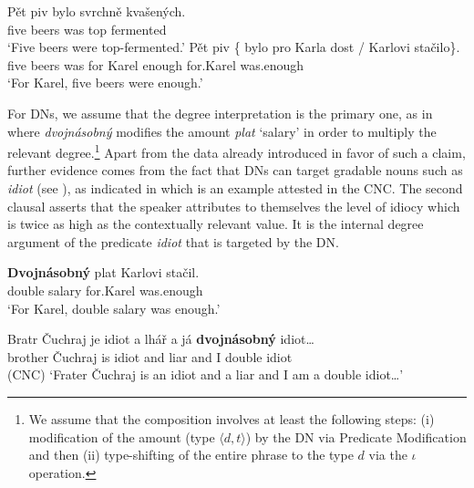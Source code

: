 \documentclass[output=paper,modfonts,hidelinks,newtxmath
\ChapterDOI{10.5281/zenodo.2545513}
]{langscibook}
\begin{document}
\ea \ea \gll Pět piv bylo svrchně kvašených.\label{individual-reading}\\
five beers was top fermented\\
\glt `Five beers were top-fermented.'
\ex \gll Pět piv \{\hspace{-2pt} bylo pro Karla dost / Karlovi stačilo\}.\label{degree-reading}\\
five beers {} was for Karel enough {} for.Karel was.enough\\
\glt `For Karel, five beers were enough.'
\z \z

\noindent For DNs, we assume that the degree interpretation is the primary one, as in  where  \textit{dvojnásobný} modifies the amount  \textit{plat} `salary' in order to multiply the relevant degree.\footnote{We assume that the composition involves at least the following steps: (i) modification of the amount  (type $\langle d,t\rangle$) by the DN via Predicate Modification and then (ii) type-shifting of the entire phrase to the type $d$ via the $\iota$ operation.} Apart from the data already introduced in favor of such a claim, further evidence comes from the fact that DNs can target gradable nouns such as \textit{idiot} (see \citealt{morzycki2009degree}), as indicated in  which is an example attested in the CNC. The second clausal  asserts that the speaker attributes to themselves the level of idiocy which is twice as high as the contextually relevant value. It is the internal degree argument of the predicate \textit{idiot} that is targeted by the DN.

\ea\label{dvojnasobne-degree-context} \gll \textbf{Dvojnásobný} plat Karlovi stačil.\\
double salary for.Karel was.enough\\
\glt `For Karel, double salary was enough.'
\z

\ea\label{dvojnasobny-idiot-cnc} \gll Bratr Čuchraj je idiot a lhář a já \textbf{dvojnásobný} idiot\ldots \label{dvojnasobny-idiot}\\
brother Čuchraj is idiot and liar and I double idiot\\\hfill(CNC)
\glt `Frater Čuchraj is an idiot and a liar and I am a double idiot\ldots'
\z
\end{document}
